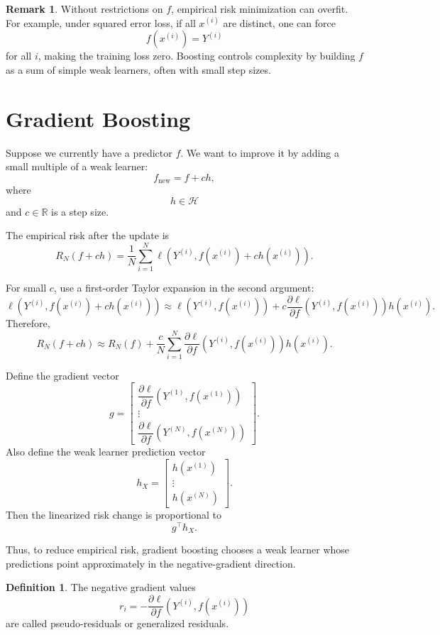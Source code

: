 \documentclass[12pt,oneside]{book}
\numberwithin{equation}{section}
\theoremstyle{definition}
\newtheorem{definition}{Definition}[section]
\newtheorem{remark}{Remark}[section]
\theoremstyle{plain}
\theoremstyle{remark}
\newcommand{\R}{\mathbb{R}}
\begin{document}
\begin{remark}
Without restrictions on $f$, empirical risk minimization can overfit. For example, under squared error loss, if all $x^{(i)}$ are distinct, one can force
\[
f(x^{(i)})=Y^{(i)}
\]
for all $i$, making the training loss zero. Boosting controls complexity by building $f$ as a sum of simple weak learners, often with small step sizes.
\end{remark}

\section{Gradient Boosting}

Suppose we currently have a predictor $f$. We want to improve it by adding a small multiple of a weak learner:
\[
f_{\text{new}}=f+c h,
\]
where
\[
h\in\mathcal{H}
\]
and $c\in\R$ is a step size.

The empirical risk after the update is
\[
R_N(f+ch)
=
\frac{1}{N}\sum_{i=1}^N
\ell(Y^{(i)},f(x^{(i)})+c h(x^{(i)})).
\]

For small $c$, use a first-order Taylor expansion in the second argument:
\[
\ell(Y^{(i)},f(x^{(i)})+c h(x^{(i)}))
\approx
\ell(Y^{(i)},f(x^{(i)}))
+
c
\frac{\partial \ell}{\partial f}
(Y^{(i)},f(x^{(i)}))
h(x^{(i)}).
\]
Therefore,
\[
R_N(f+ch)
\approx
R_N(f)
+
\frac{c}{N}
\sum_{i=1}^N
\frac{\partial \ell}{\partial f}
(Y^{(i)},f(x^{(i)}))
h(x^{(i)}).
\]

Define the gradient vector
\[
g
=
\begin{bmatrix}
\dfrac{\partial \ell}{\partial f}(Y^{(1)},f(x^{(1)}))\\
\vdots\\
\dfrac{\partial \ell}{\partial f}(Y^{(N)},f(x^{(N)}))
\end{bmatrix}.
\]
Also define the weak learner prediction vector
\[
h_X
=
\begin{bmatrix}
h(x^{(1)})\\
\vdots\\
h(x^{(N)})
\end{bmatrix}.
\]
Then the linearized risk change is proportional to
\[
g^\top h_X.
\]

Thus, to reduce empirical risk, gradient boosting chooses a weak learner whose predictions point approximately in the negative-gradient direction.

\begin{definition}
The negative gradient values
\[
r_i
=
-
\frac{\partial \ell}{\partial f}
(Y^{(i)},f(x^{(i)}))
\]
are called pseudo-residuals or generalized residuals.
\end{definition}
\end{document}
